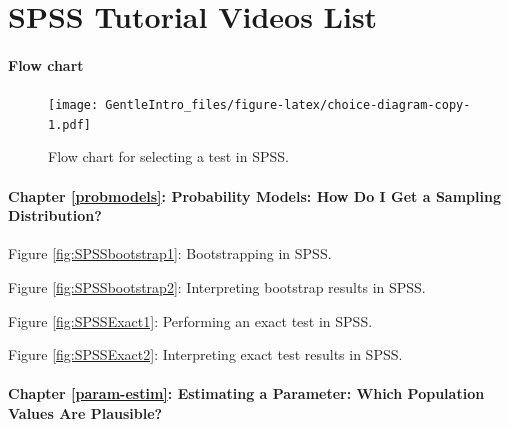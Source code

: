 \documentclass[a4paper]{book}
\theoremstyle{definition}
\theoremstyle{definition}
\theoremstyle{definition}
\theoremstyle{remark}
\begin{document}
\chapter*{SPSS Tutorial Videos List}\label{spss-tutorial-videos-list}

\subsubsection*{Flow chart}\label{flow-chart}

\begin{figure}[H]
\centering
\texttt{[image: GentleIntro\_files/figure-latex/choice-diagram-copy-1.pdf]}
\caption{\label{fig:choice-diagram-copy}Flow chart for selecting a test in
SPSS.}
\end{figure}

\subsubsection*{Chapter \ref{probmodels}: Probability Models: How Do I
Get a Sampling
Distribution?}\label{chapter-refprobmodels-probability-models-how-do-i-get-a-sampling-distribution}



Figure \ref{fig:SPSSbootstrap1}: Bootstrapping in SPSS.



Figure \ref{fig:SPSSbootstrap2}: Interpreting bootstrap results in SPSS.



Figure \ref{fig:SPSSExact1}: Performing an exact test in SPSS.



Figure \ref{fig:SPSSExact2}: Interpreting exact test results in SPSS.

\subsubsection*{Chapter \ref{param-estim}: Estimating a Parameter: Which
Population Values Are
Plausible?}\label{chapter-refparam-estim-estimating-a-parameter-which-population-values-are-plausible}
\end{document}
